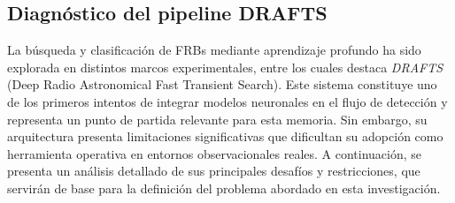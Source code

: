 \medskip



\medskip




\subsection{Diagnóstico del pipeline DRAFTS}

La búsqueda y clasificación de FRBs mediante aprendizaje profundo ha sido explorada en distintos marcos experimentales, entre los cuales destaca \textit{DRAFTS} (Deep Radio Astronomical Fast Transient Search). Este sistema constituye uno de los primeros intentos de integrar modelos neuronales en el flujo de detección y representa un punto de partida relevante para esta memoria. Sin embargo, su arquitectura presenta limitaciones significativas que dificultan su adopción como herramienta operativa en entornos observacionales reales. A continuación, se presenta un análisis detallado de sus principales desafíos y restricciones, que servirán de base para la definición del problema abordado en esta investigación.

